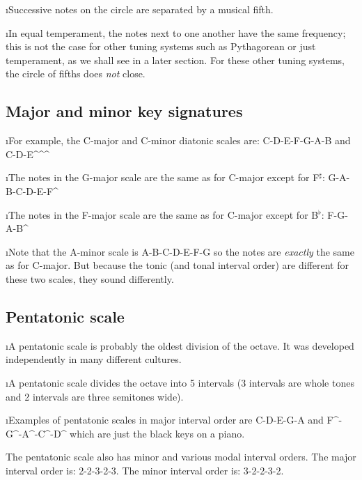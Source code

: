 \i Successive notes on the circle are separated by a musical fifth.

\i In equal temperament, the notes next to one another have the 
same frequency; 
this is not the case for other tuning systems such as Pythagorean
or just temperament, as we shall see in a later
section.
For these other tuning systems, the circle of fifths does {\em not}
close.

\ei
\subsection{Major and minor key signatures}
\bi

\i For example, the C-major and C-minor diatonic scales are:
\be
{\rm C-D-E-F-G-A-B}
\nonumber
\ee
% 
and
%
\be
{\rm C-D-E}^^^\sharp
\nonumber
\ee

\i The notes in the G-major scale are the same as for C-major 
except for F$^\sharp$:
%
\be
{\rm G-A-B-C-D-E-F}^\sharp
\nonumber
\ee
% 

\i The notes in the F-major scale are the same as for C-major 
except for B$^\flat$:
%
\be
{\rm F-G-A-B}^
\nonumber
\ee
% 

\i Note that the A-minor scale is
%
\be
{\rm A-B-C-D-E-F-G}
\nonumber
\ee
% 
so the notes are {\em exactly} the same as for C-major.
But because the tonic (and tonal interval order) are 
different for these two scales, they sound differently.

\ei
\subsection{Pentatonic scale}
\bi

\i A pentatonic scale is probably the oldest 
division of the octave.
It was developed independently in many different cultures.

\i A pentatonic scale divides the octave into
5 intervals (3 intervals are whole tones and
2 intervals are three semitones wide).

\i Examples of pentatonic scales in major interval
order are
%
\be
{\rm C-D-E-G-A} 
\ee
%
and
%
\be
{\rm F{}^\sharp-G{}^\sharp-A{}^\sharp-C{}^\sharp-D{}^\sharp}
\ee
%
which are just the black keys on a piano.

\item
The pentatonic scale also has minor
and various modal interval orders.
The major interval order is: 2-2-3-2-3.
The minor interval order is: 3-2-2-3-2.

